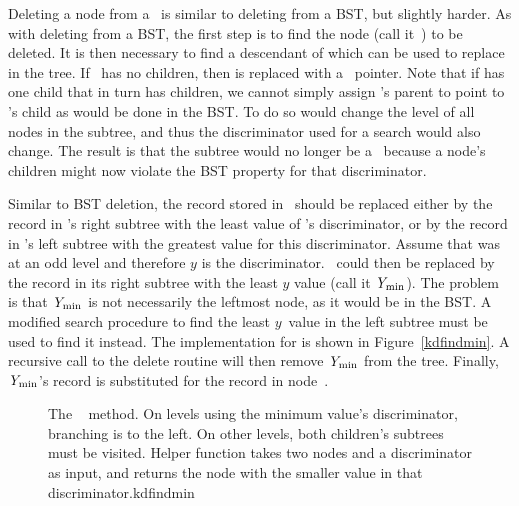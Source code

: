 Deleting a node from a \KDtree\ is similar to deleting from a BST,
but slightly harder.
As with deleting from a BST, the first step is to find the node
(call it~) to be deleted.
It is then necessary to find a descendant of  which can be
used to replace  in the tree.
If~ has no children, then  is replaced with a
\NULL\ pointer.
Note that if  has one child that in turn has children, we
cannot simply assign 's parent to point to 's child as
would be done in the BST.
To do so would change the level of all nodes in the subtree, and thus
the discriminator used for a search would also change.
The result is that the subtree would no longer be a \KDtree\ because a
node's children might now violate the BST property for that
discriminator.

Similar to BST deletion, the record stored in ~should
be replaced either by the record in 's right subtree with the
least value of 's discriminator, or by the record in
's left subtree with the greatest value for this discriminator.
Assume that  was at an odd level and
therefore $y$ is the discriminator.
~could then be replaced by the record in its right subtree
with the least $y$ value (call it ${\textit{Y}}_{\rm min}$).
The problem is that ${\textit{Y}}_{\rm min}$ is not necessarily the
leftmost node, as it would be in the BST.
A modified search procedure to find the least $y$~value in the left
subtree must be used to find it instead.
The implementation for  is shown in Figure~\ref{kdfindmin}.
A recursive call to the delete routine will then remove
${\textit{Y}}_{\rm min}$ from the tree.
Finally, ${\textit{Y}}_{\rm min}$'s record is substituted for the
record in node~.

\begin{figure}
\vspace{-\medskipamount}
{The \KDtree\  method.
On levels using the minimum value's discriminator, branching is to the
left.
On other levels, both children's subtrees must be visited.
Helper function  takes two nodes and a discriminator as
input, and returns the node with the smaller value in that
discriminator.}{kdfindmin}

\bigskip
\end{figure}

